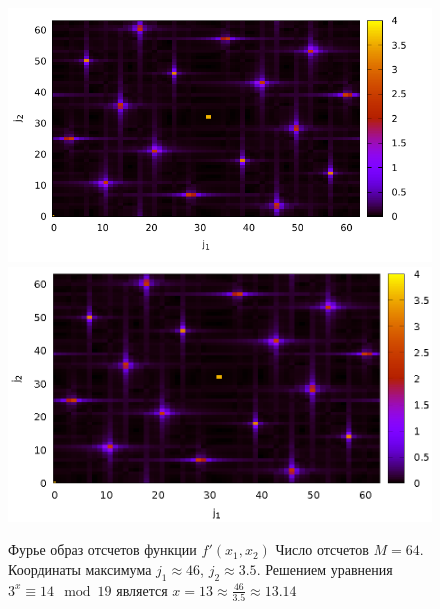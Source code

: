 \begin{figure}
\centering

\ifpdf
\includegraphics[angle=0]
{./part4/quantcomp/picdiscretlog3.pdf}
\else
\includegraphics[angle=0]
{./part4/quantcomp/picdiscretlog3.eps}
\fi

%

\caption{Фурье образ отсчетов функции 
$f'(x_1, x_2)$
Число отсчетов $M=64$. Координаты максимума $j_1 \approx 46$, $j_2 \approx 3.5$. 
Решением уравнения $3^x \equiv 14 \mod 19$
является $x = 13 \approx \frac{46}{3.5} \approx 13.14$
} 
\label{fig:part4:quantcomp:dl3}
\end{figure}
